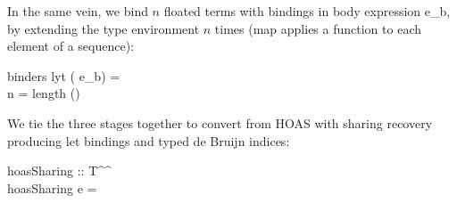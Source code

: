 In the same vein, we bind $n$ floated terms \<\> with \<\> bindings in body expression \<e_b\>, by extending the type environment $n$ times (\<map\> applies a function to each element of a sequence):
%
\begin{haskell}
  binders lyt \overline{\nu_\rho} ( \succ e_b) =
  \\
  \hsap{} n = length ()
\end{haskell}
%
We tie the three stages together to convert from HOAS with sharing recovery producing let bindings and typed de Bruijn indices:
%
\begin{haskell}
  hoasSharing :: T^\tau \to \iT[()]^\tau \\
  hoasSharing e = 
\end{haskell}

